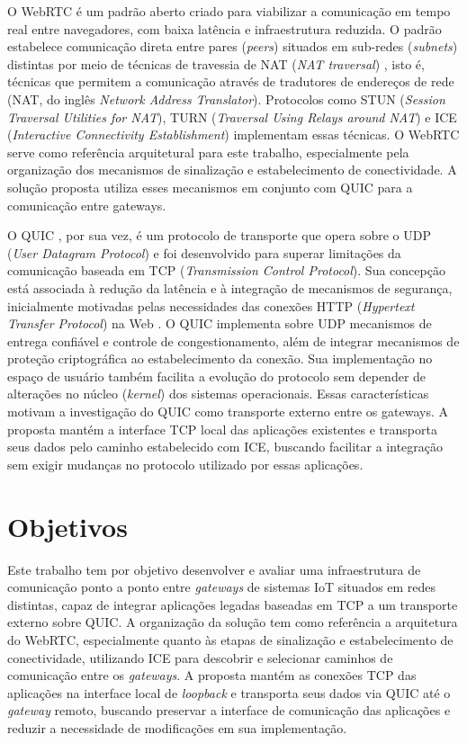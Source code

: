 O WebRTC \citep{WebRTCForTheCurious} é um padrão aberto criado para viabilizar a comunicação em tempo real entre navegadores, com baixa latência e infraestrutura reduzida. O padrão estabelece comunicação direta entre pares (\textit{peers}) situados em sub-redes (\textit{subnets}) distintas por meio de técnicas de travessia de NAT (\textit{NAT traversal}) \citep{rfc5128}, isto é, técnicas que permitem a comunicação através de tradutores de endereços de rede (NAT, do inglês \textit{Network Address Translator}). Protocolos como STUN (\textit{Session Traversal Utilities for NAT}), TURN (\textit{Traversal Using Relays around NAT}) e ICE (\textit{Interactive Connectivity Establishment}) implementam essas técnicas. O WebRTC serve como referência arquitetural para este trabalho, especialmente pela organização dos mecanismos de sinalização e estabelecimento de conectividade. A solução proposta utiliza esses mecanismos em conjunto com QUIC para a comunicação entre gateways.

O QUIC \citep{rfc9000}, por sua vez, é um protocolo de transporte que opera sobre o UDP (\textit{User Datagram Protocol}) e foi desenvolvido para superar limitações da comunicação baseada em TCP (\textit{Transmission Control Protocol}). Sua concepção está associada à redução da latência e à integração de mecanismos de segurança, inicialmente motivadas pelas necessidades das conexões HTTP (\textit{Hypertext Transfer Protocol}) na Web \citep{marx2020quic}. O QUIC implementa sobre UDP mecanismos de entrega confiável e controle de congestionamento, além de integrar mecanismos de proteção criptográfica ao estabelecimento da conexão. Sua implementação no espaço de usuário também facilita a evolução do protocolo sem depender de alterações no núcleo (\textit{kernel}) dos sistemas operacionais. Essas características motivam a investigação do QUIC como transporte externo entre os gateways. A proposta mantém a interface TCP local das aplicações existentes e transporta seus dados pelo caminho estabelecido com ICE, buscando facilitar a integração sem exigir mudanças no protocolo utilizado por essas aplicações.

\section{Objetivos}

Este trabalho tem por objetivo desenvolver e avaliar uma infraestrutura de comunicação ponto a ponto entre \textit{gateways} de sistemas IoT situados em redes distintas, capaz de integrar aplicações legadas baseadas em TCP a um transporte externo sobre QUIC. A organização da solução tem como referência a arquitetura do WebRTC, especialmente quanto às etapas de sinalização e estabelecimento de conectividade, utilizando ICE para descobrir e selecionar caminhos de comunicação entre os \textit{gateways}. A proposta mantém as conexões TCP das aplicações na interface local de \textit{loopback} e transporta seus dados via QUIC até o \textit{gateway} remoto, buscando preservar a interface de comunicação das aplicações e reduzir a necessidade de modificações em sua implementação.

